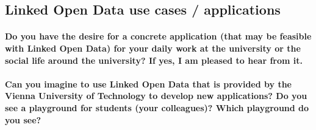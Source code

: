 \documentclass{article}
\begin{document}
\subsection{Linked Open Data use cases / applications}
\label{questionaire:lod-usecase-app}

\paragraph{Do you have the desire for a concrete application (that may be feasible with Linked Open Data) for your daily work at the university or the social life around the university? If yes, I am pleased to hear from it.}

\opentwo

\paragraph{Can you imagine to use Linked Open Data that is provided by the Vienna University of Technology to develop new applications? Do you see a playground for students (your colleagues)? Which playground do you see?}

\opentwo


\printbibliography[title={Appendix references}, keyword=appendix]
\end{document}
